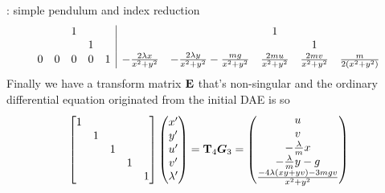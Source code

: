 \begin{example}{: simple pendulum and index reduction}
\[{\begin{array} {ccccc | ccccc}
			&& 1 &&&&& 1 \\ 
			&&& 1 &&&&& 1 \\ 
			0 & 0 & 0 & 0 & 1 & - \frac{2 \lambda x}{x^2 + y^2} & - \frac{2\lambda y}{x^2+y^2} - \frac{mg}{x^2+y^2} & \frac{2mu}{x^2+y^2} & \frac{2mv }{x^2 + y^2} & \frac{m}{2(x^2+y^2)}
		\end{array}} \]
		Finally we have a transform matrix $\mathbf{E}$ that's non-singular and the ordinary differential equation originated from the initial DAE is so
		\[ \begin{bmatrix}  1  \\ & 1 \\ && 1 \\ &&& 1 \\ &&&& 1  \end{bmatrix} \begin{pmatrix} x' \\ y' \\ u' \\ v' \\ \lambda' \end{pmatrix} = \mathbf{T}_4 \boldsymbol{G}_3 = \begin{pmatrix} u \\ v \\ - \frac \lambda m x \\ -\frac \lambda m  y - g \\ \frac{-4\lambda(xy + yv) - 3mgv}{x^2 + y^2}  \end{pmatrix} \]
	\end{example}

